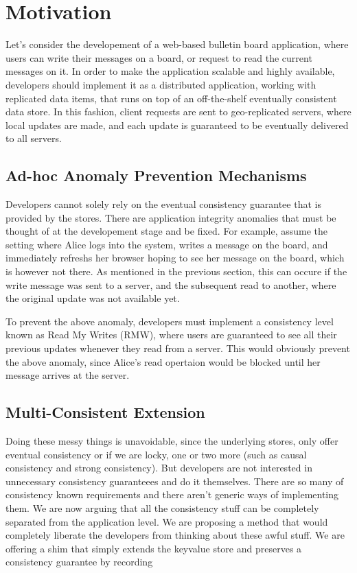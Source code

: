 \section{Motivation}

Let's consider the developement of a web-based bulletin board application, where
users can write their messages on a board, or request to read the current
messages on it.
In order to make the application scalable and highly
available, developers should implement it as a distributed application, working
with replicated data items, that runs on top of an off-the-shelf
eventually consistent data store. In this fashion, client requests are
sent to geo-replicated servers, where local updates are made, and each
update is guaranteed to be eventually delivered to all servers. 

\subsection{Ad-hoc Anomaly Prevention Mechanisms}
Developers cannot solely rely on the eventual consistency guarantee that
is provided by the stores. There are application integrity anomalies
that must be thought of at the developement stage and be fixed. For
example, assume the setting where Alice logs into the system, writes a
message on the board, and immediately refreshs her browser hoping to see
her message on the board, which is however not there. As mentioned in
the previous section, this can occure if
the write message was sent to a server, and the subsequent read to
another, where the original update was not available yet. 

To prevent the above anomaly, developers must implement a consistency level known as 
Read My Writes (RMW), where users are guaranteed to see all their
previous updates whenever they read from a server. This would
obviously prevent the above anomaly, since Alice's read opertaion would
be blocked until her message arrives at the server. 





\subsection{Multi-Consistent Extension}
Doing these messy things is unavoidable, since the underlying stores,
only offer eventual consistency or if we are locky, one or two more
(such as causal consistency and strong consistency). But developers are
not interested in unnecessary consistency guaranteees and do it
themselves. There are so many of consistency known requirements and
there aren't generic ways of implementing them.
We are now arguing that all the consistency stuff can be
completely separated from the application level. We are proposing a
method that would completely liberate the developers from thinking about
these awful stuff. We are offering a shim that simply extends the
keyvalue store and preserves a consistency guarantee by recording
